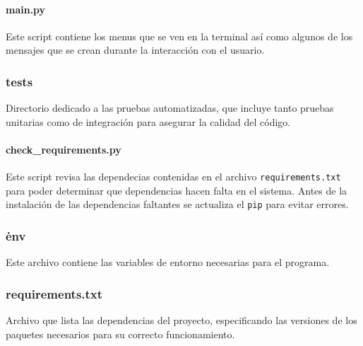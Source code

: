 \paragraph{main.py}
\noindent Este script contiene los menus que se ven en la terminal así como algunos de los mensajes que se crean durante la interacción con el usuario.

\subsubsection*{tests}
\noindent Directorio dedicado a las pruebas automatizadas, que incluye tanto pruebas unitarias como de integración para asegurar la calidad del código.
\paragraph{check\_requirements.py}
\noindent Este script revisa las dependecias contenidas en el archivo \texttt{requirements.txt} para poder determinar que dependencias hacen falta en el sistema. Antes de la instalación de las dependencias faltantes se actualiza el \texttt{pip} para evitar errores.

\subsubsection*{\. env}
\noindent Este archivo contiene las variables de entorno necesarias para el programa. 

\subsubsection*{requirements.txt}
\noindent Archivo que lista las dependencias del proyecto, especificando las versiones de los paquetes necesarios para su correcto funcionamiento.

